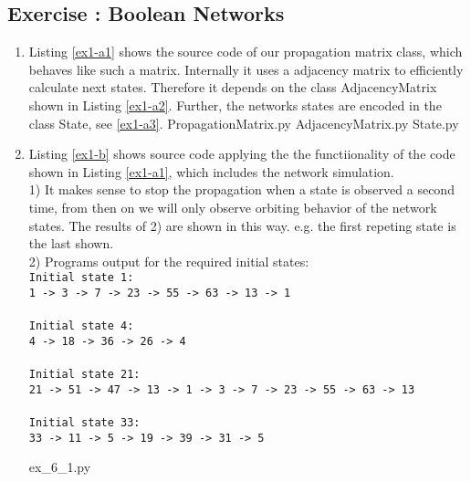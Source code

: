 \documentclass[10pt,a4paper]{article}
\newcommand{\exercise}[1]
{
  \stepcounter{subsection}
  \subsection*{Exercise \thesubsection: #1}

}
\begin{document}
\exercise{Boolean Networks}
\begin{enumerate}
\item Listing \ref{ex1-a1} shows the source code of our propagation matrix class, which behaves like such a matrix. Internally it uses a adjacency matrix to efficiently calculate next states. Therefore it depends on the class AdjacencyMatrix shown in Listing \ref{ex1-a2}. Further, the networks states are encoded in the class State, see \ref{ex1-a3}.
 {PropagationMatrix.py}
 {AdjacencyMatrix.py}
 {State.py}
\newpage
\item Listing \ref{ex1-b} shows source code applying the the functiionality of the code shown in Listing \ref{ex1-a1}, which includes the network simulation.\\

1) It makes sense to stop the propagation when a state is observed a second time, from then on we will only observe orbiting behavior of the network states. The results of 2) are shown in this way. e.g. the first repeting state is the last shown.\\

2) Programs output for the required initial states:\\
\texttt{Initial state 1:\\
1 -> 3 -> 7 -> 23 -> 55 -> 63 -> 13 -> 1\\
\\
Initial state 4:\\
4 -> 18 -> 36 -> 26 -> 4\\
\\
Initial state 21:\\
21 -> 51 -> 47 -> 13 -> 1 -> 3 -> 7 -> 23 -> 55 -> 63 -> 13\\
\\
Initial state 33:\\
33 -> 11 -> 5 -> 19 -> 39 -> 31 -> 5\\
}

 {ex_6_1.py}


\end{enumerate}
\end{document}
